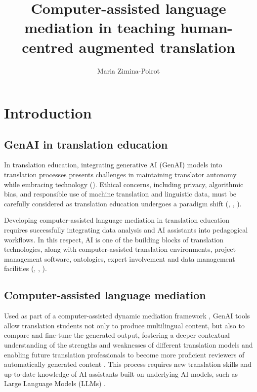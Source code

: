 \documentclass[output=paper]{langscibook}
\author{Maria Zimina-Poirot\orcid{}\affiliation{Université Paris Cité, France}}
\title[Computer-assisted LM in teaching human-centred AT]{Computer-assisted language mediation in teaching human-centred augmented translation}
\begin{document}
\maketitle



\section{Introduction}\label{sec:8:1}

\subsection{GenAI in translation education}
In translation education, integrating generative AI (GenAI) models into translation processes presents challenges in maintaining translator autonomy while embracing technology (\citealt{obrien_human-centered_2024}). Ethical concerns, including privacy, algorithmic bias, and responsible use of machine translation and linguistic data, must be carefully considered as translation education undergoes a paradigm shift (\citealt{ramírezpolo23}, \citealt{slimic23}, \citealt{tavarestor23}).

Developing computer-assisted language mediation in translation education requires successfully integrating data analysis and AI assistants into pedagogical workflows. In this respect, AI is one of the building blocks of translation technologies, along with computer-assisted translation environments, project management software, ontologies, expert involvement and data management facilities (\citealt{garcia2023}, \citealt{he2023exploringhumanliketranslationstrategy}, \citealt{mitchellschuite20}).

\subsection{Computer-assisted language mediation}
Used as part of a computer-assisted dynamic mediation framework \citep{hu2024enablingintelligentinteractionsagent}, GenAI tools allow translation students not only to produce multilingual content, but also to compare and fine-tune the generated output, fostering a deeper contextual understanding of the strengths and weaknesses of different translation models and enabling future translation professionals to become more proficient reviewers of automatically generated content \citep{zhuang2024staticbenchmarksadaptivetesting}. This process requires new translation skills and up-to-date knowledge of AI assistants built on underlying AI models, such as Large Language Models (LLMs) \citep{douglas2023largelanguagemodels}. 
\end{document}
